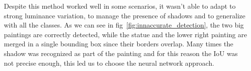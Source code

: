 Despite this method worked well in some scenarios, it wasn't able to adapt to strong luminance variation, to manage the presence of shadows and to generalize with all the classes. As we can see in fig~\ref{fig:innaccurate_detection}, the two big paintings are correctly detected, while the statue and the lower right painting are merged in a single bounding box since their borders overlap. Many times the shadow was recognized as part of the painting and for this reason the IoU was not precise enough, this led us to choose the neural network approach.

